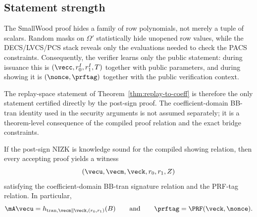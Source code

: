 \subsection{Statement strength}
\label{subsec:statement-strength}
The SmallWood proof hides a family of row polynomials, not merely a tuple of scalars.  Random masks on
$\Omega'$ statistically hide unopened row values, while the DECS/LVCS/PCS stack reveals only the evaluations
needed to check the PACS constraints.  Consequently, the verifier learns only the public statement: during
issuance this is $(\vecc,r_0^I,r_1^I,T)$ together with public parameters, and during showing it is
$(\nonce,\prftag)$ together with the public verification context.

The replay-space statement of Theorem~\ref{thm:replay-to-coeff} is therefore the only statement certified
directly by the post-sign proof.  The coefficient-domain BB-tran identity used in the security arguments is not
assumed separately; it is a theorem-level consequence of the compiled proof relation and the exact bridge
constraints.

\begin{corollary}\label{cor:showing-proof-consequence}
If the post-sign NIZK is knowledge sound for the compiled showing relation, then every accepting proof yields a
witness
\[
  (\vecu,\vecm,\veck,r_0,r_1,Z)
\]
satisfying the coefficient-domain BB-tran signature relation and the PRF-tag relation.  In particular,
\[
  \mA\vecu=h_{\mathrm{tran},\vecm\Vert\veck,(r_0,r_1)}(B)
  \qquad\text{and}\qquad
  \prftag=\PRF(\veck,\nonce).
\]
\end{corollary}
